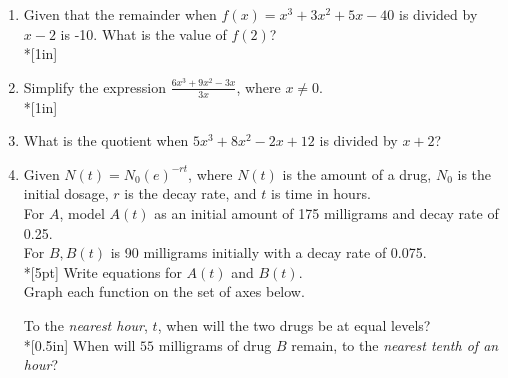 \documentclass[12pt, oneside]{article}
\begin{document}
\begin{enumerate}
\item Given that the remainder when  $f(x)=x^3+3x^2+5x-40$ is divided by $x-2$ is -10. What is the value of $f(2)$? \\*[1in]

\item Simplify the expression $\displaystyle \frac{6x^3+9x^2-3x}{3x}$, where $x \neq 0$.  \\*[1in]

\item What is the quotient when $5x^3+8x^2-2x+12$ is divided by $x + 2$?%

\newpage

\item Given $N(t)=N_0(e)^{-rt}$, where $N(t)$ is the amount of a drug, $N_0$ is the initial dosage, $r$ is the decay rate, and $t$ is time in hours.\\[5pt] For $A$, model $A(t)$ as an initial amount of 175 milligrams and decay rate of 0.25.\\[5pt]
For $B, B(t)$ is 90 milligrams initially with a decay rate of 0.075.\\*[5pt]
Write equations for $A(t)$ and $B(t)$.\\[.75in]
Graph each function on the set of axes below.
\begin{center}
\end{center}
To the \emph{nearest hour}, $t$, when will the two drugs be at equal levels?\\*[0.5in]
When will $55$ milligrams of drug $B$ remain, to the \emph{nearest tenth of an hour}? 
\newpage


\end{enumerate}
\end{document}
